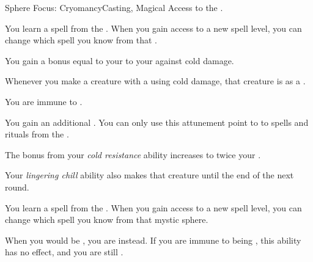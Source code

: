     \begin{feat}{Sphere Focus: Cryomancy}{Casting, Magical}
        \featpre Access to the  .

         You learn a spell from the  .
        When you gain access to a new spell level, you can change which spell you know from that .

         You gain a bonus equal to your  to your  against cold damage.

         Whenever you make a creature  with a  using cold damage, that creature is  as a .

         You are immune to .

         You gain an additional .
        You can only use this attunement point to  to spells and rituals from the  .

         The bonus from your \textit{cold resistance} ability increases to twice your .

         Your \textit{lingering chill} ability also makes that creature  until the end of the next round.

         You learn a spell from the  .
        When you gain access to a new spell level, you can change which spell you know from that mystic sphere.

         When you would be , you are  instead.
        If you are immune to being , this ability has no effect, and you are still .
    \end{feat}

